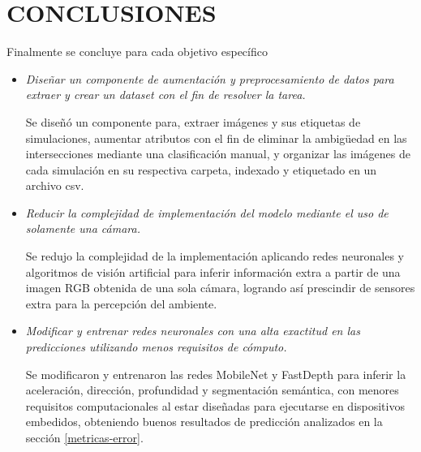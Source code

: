 \section{CONCLUSIONES}
Finalmente se concluye para cada objetivo específico
\begin{itemize}
	\item \textit{Diseñar un componente de aumentación y preprocesamiento de datos para extraer y crear un dataset con el fin de resolver la tarea.}
	
	Se diseñó un componente para, extraer imágenes y sus etiquetas de simulaciones, aumentar atributos con el fin de eliminar la ambigüedad en las intersecciones mediante una clasificación manual, y organizar las imágenes de cada simulación en su respectiva carpeta, indexado y etiquetado en un archivo csv.
	
	\item \textit{Reducir la complejidad de implementación del modelo mediante el uso de solamente una cámara.}
	
	Se redujo la complejidad de la implementación aplicando redes neuronales y algoritmos de visión artificial para inferir información extra a partir de una imagen RGB obtenida de una sola cámara, logrando así prescindir de sensores extra para la percepción del ambiente.
	
	\item \textit{Modificar y entrenar redes neuronales con una alta exactitud en las predicciones utilizando menos requisitos de cómputo.}
	
	
	Se modificaron y entrenaron las redes MobileNet y FastDepth para inferir la aceleración, dirección, profundidad y segmentación semántica, con menores requisitos computacionales al estar diseñadas para ejecutarse en dispositivos embedidos, obteniendo buenos resultados de predicción analizados en la sección \ref{metricas-error}.
	

\end{itemize}

